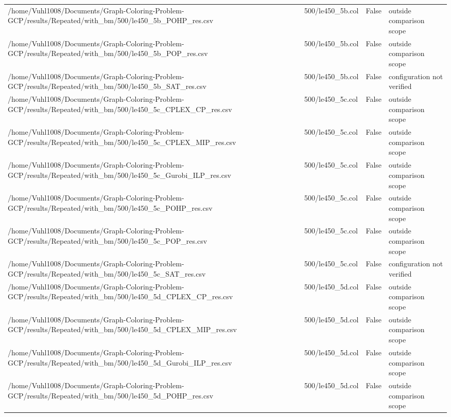 \begin{table}[htbp]
\begin{tabular}{llll}
/home/Vuhl1008/Documents/Graph-Coloring-Problem-GCP/results/Repeated/with\_bm/500/le450\_5b\_POHP\_res.csv & 500/le450\_5b.col & False & outside comparison scope \\
/home/Vuhl1008/Documents/Graph-Coloring-Problem-GCP/results/Repeated/with\_bm/500/le450\_5b\_POP\_res.csv & 500/le450\_5b.col & False & outside comparison scope \\
/home/Vuhl1008/Documents/Graph-Coloring-Problem-GCP/results/Repeated/with\_bm/500/le450\_5b\_SAT\_res.csv & 500/le450\_5b.col & False & configuration not verified \\
/home/Vuhl1008/Documents/Graph-Coloring-Problem-GCP/results/Repeated/with\_bm/500/le450\_5c\_CPLEX\_CP\_res.csv & 500/le450\_5c.col & False & outside comparison scope \\
/home/Vuhl1008/Documents/Graph-Coloring-Problem-GCP/results/Repeated/with\_bm/500/le450\_5c\_CPLEX\_MIP\_res.csv & 500/le450\_5c.col & False & outside comparison scope \\
/home/Vuhl1008/Documents/Graph-Coloring-Problem-GCP/results/Repeated/with\_bm/500/le450\_5c\_Gurobi\_ILP\_res.csv & 500/le450\_5c.col & False & outside comparison scope \\
/home/Vuhl1008/Documents/Graph-Coloring-Problem-GCP/results/Repeated/with\_bm/500/le450\_5c\_POHP\_res.csv & 500/le450\_5c.col & False & outside comparison scope \\
/home/Vuhl1008/Documents/Graph-Coloring-Problem-GCP/results/Repeated/with\_bm/500/le450\_5c\_POP\_res.csv & 500/le450\_5c.col & False & outside comparison scope \\
/home/Vuhl1008/Documents/Graph-Coloring-Problem-GCP/results/Repeated/with\_bm/500/le450\_5c\_SAT\_res.csv & 500/le450\_5c.col & False & configuration not verified \\
/home/Vuhl1008/Documents/Graph-Coloring-Problem-GCP/results/Repeated/with\_bm/500/le450\_5d\_CPLEX\_CP\_res.csv & 500/le450\_5d.col & False & outside comparison scope \\
/home/Vuhl1008/Documents/Graph-Coloring-Problem-GCP/results/Repeated/with\_bm/500/le450\_5d\_CPLEX\_MIP\_res.csv & 500/le450\_5d.col & False & outside comparison scope \\
/home/Vuhl1008/Documents/Graph-Coloring-Problem-GCP/results/Repeated/with\_bm/500/le450\_5d\_Gurobi\_ILP\_res.csv & 500/le450\_5d.col & False & outside comparison scope \\
/home/Vuhl1008/Documents/Graph-Coloring-Problem-GCP/results/Repeated/with\_bm/500/le450\_5d\_POHP\_res.csv & 500/le450\_5d.col & False & outside comparison scope \\

\end{tabular}
\end{table}
